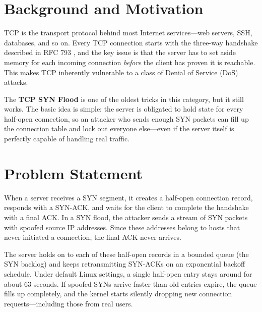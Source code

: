\documentclass[11pt,a4paper]{report}
\begin{document}
\section{Background and Motivation}
TCP is the transport protocol behind most Internet services---web servers, SSH, databases, and so on. Every TCP connection starts with the three-way handshake described in RFC 793 \cite{rfc793}, and the key issue is that the server has to set aside memory for each incoming connection \emph{before} the client has proven it is reachable. This makes TCP inherently vulnerable to a class of Denial of Service (DoS) attacks.

The \textbf{TCP SYN Flood} is one of the oldest tricks in this category, but it still works. The basic idea is simple: the server is obligated to hold state for every half-open connection, so an attacker who sends enough SYN packets can fill up the connection table and lock out everyone else---even if the server itself is perfectly capable of handling real traffic.

\section{Problem Statement}
When a server receives a SYN segment, it creates a half-open connection record, responds with a SYN-ACK, and waits for the client to complete the handshake with a final ACK. In a SYN flood, the attacker sends a stream of SYN packets with spoofed source IP addresses. Since these addresses belong to hosts that never initiated a connection, the final ACK never arrives.

The server holds on to each of these half-open records in a bounded queue (the SYN backlog) and keeps retransmitting SYN-ACKs on an exponential backoff schedule. Under default Linux settings, a single half-open entry stays around for about 63 seconds. If spoofed SYNs arrive faster than old entries expire, the queue fills up completely, and the kernel starts silently dropping new connection requests---including those from real users.
\end{document}
